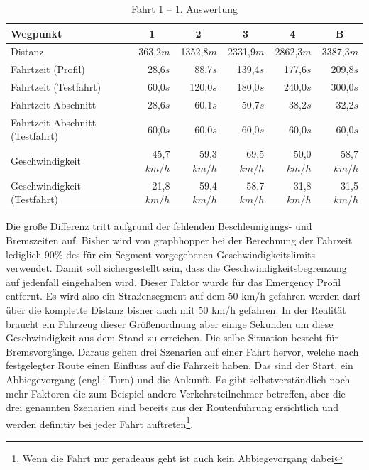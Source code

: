 \begin{table}[htb]
\centering
\small
\caption{Fahrt 1 -- 1. Auswertung}
\label{tab:driveinit}
\begin{tabular}{|l|r|r|r|r|r|}
\hline
Wegpunkt                               & \multicolumn{1}{c|}{1} & \multicolumn{1}{c|}{2} & \multicolumn{1}{c|}{3} & \multicolumn{1}{c|}{4} & \multicolumn{1}{c|}{B}      \\ \hline
Distanz                                & 363,2$m$                & 1352,8$m$               & 2331,9$m$               & 2862,3$m$               & 3387,3$m$               \\ \hline
Fahrtzeit (Profil)                     & 28,6$s$                 & 88,7$s$                 & 139,4$s$                & 177,6$s$                & 209,8$s$                \\ \hline
Fahrtzeit (Testfahrt)                  & 60,0$s$                 & 120,0$s$                & 180,0$s$                & 240,0$s$                & 300,0$s$                \\ \hline
Fahrtzeit Abschnitt                    & 28,6$s$                 & 60,1$s$                 & 50,7$s$                 & 38,2$s$                 & 32,2$s$                 \\ \hline
Fahrtzeit Abschnitt (Testfahrt)        & 60,0$s$                 & 60,0$s$                 & 60,0$s$                 & 60,0$s$                 & 60,0$s$                 \\ \hline
Geschwindigkeit                        & 45,7$km/h$              & 59,3$km/h$              & 69,5$km/h$              & 50,0$km/h$              & 58,7$km/h$              \\ \hline
Geschwindigkeit (Testfahrt)            & 21,8$km/h$              & 59,4$km/h$              & 58,7$km/h$              & 31,8$km/h$              & 31,5$km/h$              \\ \hline
\end{tabular}
\end{table}

Die große Differenz tritt aufgrund der fehlenden Beschleunigungs- und Bremszeiten auf.
Bisher wird von graphhopper bei der Berechnung der Fahrzeit lediglich 90$\%$ des für ein Segment vorgegebenen Geschwindigkeitslimits verwendet.
Damit soll sichergestellt sein, dass die Geschwindigkeitsbegrenzung auf jedenfall eingehalten wird.
Dieser Faktor wurde für das Emergency Profil entfernt.
Es wird also ein Straßensegment auf dem 50 km/h gefahren werden darf über die komplette Distanz bisher auch mit 50 km/h gefahren.
In der Realität braucht ein Fahrzeug dieser Größenordnung aber einige Sekunden um diese Geschwindigkeit aus dem Stand zu erreichen.
Die selbe Situation besteht für Bremsvorgänge.
Daraus gehen drei Szenarien auf einer Fahrt hervor, welche nach festgelegter Route einen Einfluss auf die Fahrzeit haben.
Das sind der Start, ein Abbiegevorgang (engl.: Turn) und die Ankunft.
Es gibt selbstverständlich noch mehr Faktoren die zum Beispiel andere Verkehrsteilnehmer betreffen, aber die drei genannten Szenarien sind bereits aus der Routenführung ersichtlich und werden definitiv bei jeder Fahrt auftreten\footnote{Wenn die Fahrt nur geradeaus geht ist auch kein Abbiegevorgang dabei}.

